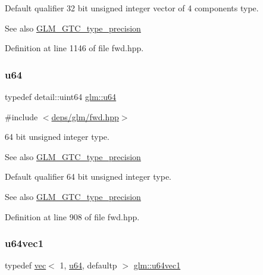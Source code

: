 Default qualifier 32 bit unsigned integer vector of 4 components type. \begin{DoxySeeAlso}{See also}
\hyperlink{group__gtc__type__precision}{G\+L\+M\+\_\+\+G\+T\+C\+\_\+type\+\_\+precision} 
\end{DoxySeeAlso}


Definition at line 1146 of file fwd.\+hpp.

\mbox{\label{group__gtc__type__precision_ga71cedd4972f9cb1a5e14dfe5ab83ecd7}} 
\subsubsection{\texorpdfstring{u64}{u64}}
{\footnotesize\ttfamily typedef detail\+::uint64 \hyperlink{group__gtc__type__precision_ga71cedd4972f9cb1a5e14dfe5ab83ecd7}{glm\+::u64}}



{\ttfamily \#include $<$\hyperlink{fwd_8hpp}{deps/glm/fwd.\+hpp}$>$}

64 bit unsigned integer type. \begin{DoxySeeAlso}{See also}
\hyperlink{group__gtc__type__precision}{G\+L\+M\+\_\+\+G\+T\+C\+\_\+type\+\_\+precision}
\end{DoxySeeAlso}
Default qualifier 64 bit unsigned integer type. \begin{DoxySeeAlso}{See also}
\hyperlink{group__gtc__type__precision}{G\+L\+M\+\_\+\+G\+T\+C\+\_\+type\+\_\+precision} 
\end{DoxySeeAlso}


Definition at line 908 of file fwd.\+hpp.

\mbox{\label{group__gtc__type__precision_gaf01aa7972f78cabc61558a0171d78a01}} 
\subsubsection{\texorpdfstring{u64vec1}{u64vec1}}
{\footnotesize\ttfamily typedef \hyperlink{structglm_1_1vec}{vec}$<$ 1, \hyperlink{group__gtc__type__precision_ga71cedd4972f9cb1a5e14dfe5ab83ecd7}{u64}, defaultp $>$ \hyperlink{group__gtc__type__precision_gaf01aa7972f78cabc61558a0171d78a01}{glm\+::u64vec1}}



